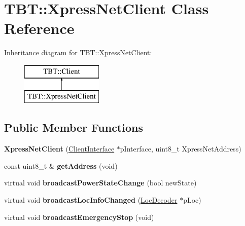 \hypertarget{classTBT_1_1XpressNetClient}{}\section{T\+BT\+:\+:Xpress\+Net\+Client Class Reference}
\label{classTBT_1_1XpressNetClient}
Inheritance diagram for T\+BT\+:\+:Xpress\+Net\+Client\+:\begin{figure}[H]
\begin{center}
\leavevmode
\includegraphics[height=2.000000cm]{classTBT_1_1XpressNetClient}
\end{center}
\end{figure}
\subsection*{Public Member Functions}
\begin{DoxyCompactItemize}
\item 
\mbox{\label{classTBT_1_1XpressNetClient_a7647a4b5b68c29a2ed7d8832b6d1b692}} 
{\bfseries Xpress\+Net\+Client} (\hyperlink{classTBT_1_1ClientInterface}{Client\+Interface} $\ast$p\+Interface, uint8\+\_\+t Xpress\+Net\+Address)
\item 
\mbox{\label{classTBT_1_1XpressNetClient_aae838c0fdb74c9c7220056e3fa011390}} 
const uint8\+\_\+t \& {\bfseries get\+Address} (void)
\item 
\mbox{\label{classTBT_1_1XpressNetClient_a6f104050aad16ef336a6b83d2c60550a}} 
virtual void {\bfseries broadcast\+Power\+State\+Change} (bool new\+State)
\item 
\mbox{\label{classTBT_1_1XpressNetClient_a0ef986da287d7fbfea163ae6016a7154}} 
virtual void {\bfseries broadcast\+Loc\+Info\+Changed} (\hyperlink{classTBT_1_1LocDecoder}{Loc\+Decoder} $\ast$p\+Loc)
\item 
\mbox{\label{classTBT_1_1XpressNetClient_a5909e439836c772127bc24918aa0a291}} 
virtual void {\bfseries broadcast\+Emergency\+Stop} (void)
\end{DoxyCompactItemize}
